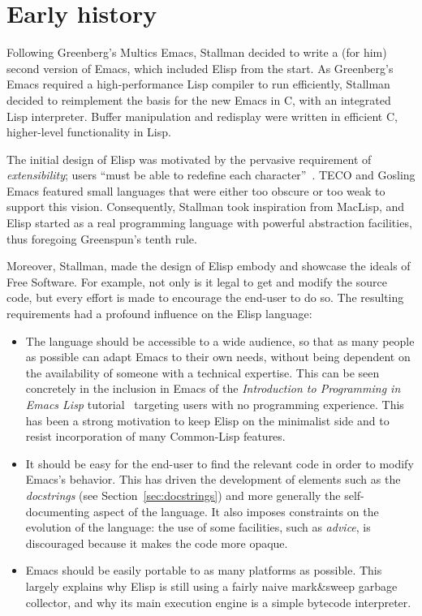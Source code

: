 \documentclass[format=acmsmall, review=false, screen=true]{acmart}
\newcommand \Elisp {Elisp}
\begin{document}
\section{Early history}         %
\label{sec:early-history}

Following Greenberg's Multics Emacs, Stallman decided to write a (for
him) second version of Emacs, which included \Elisp{} from the start.
As Greenberg's Emacs required a high-performance Lisp compiler to run
efficiently, Stallman decided to reimplement the basis for the new
Emacs in C, with an integrated Lisp interpreter.  Buffer manipulation
and redisplay were written in efficient C, higher-level functionality
in Lisp.

The initial design of \Elisp{} was motivated by the pervasive
requirement of \emph{extensibility}; users ``must be able to
redefine each character''~\cite{Stallman1981}.  TECO and Gosling Emacs
featured small languages that were either too obscure or too weak to
support this vision.  Consequently, Stallman took inspiration from
MacLisp, and \Elisp{} started as a real programming language with
powerful abstraction facilities, thus foregoing Greenspun's tenth
rule.

Moreover, Stallman, made the design of \Elisp{}
embody and showcase the ideals of Free Software.  For example, not only
is it legal to get and modify the source code, but every effort
is made to encourage the end-user to do so.  The resulting requirements had a profound
influence on the \Elisp{} language:
\begin{itemize}
\item The language should be accessible to a wide audience, so that as many
  people as possible can adapt Emacs to their own needs, without being
  dependent on the availability of someone with a technical expertise.
  This can be seen concretely in the inclusion in Emacs of the
  \emph{Introduction to Programming in Emacs Lisp}
  tutorial~\citep{ElispIntro} targeting users with no programming
  experience.  This has been a strong motivation to keep \Elisp{} on the
  minimalist side and to resist incorporation of many Common-Lisp features.
\item It should be easy for the end-user to find the relevant code in order
  to modify Emacs's behavior.  This has driven the development of elements
  such as the \emph{docstrings} (see Section~\ref{sec:docstrings}) and more generally the self-documenting
  aspect of the language.  It also imposes constraints on the evolution of
  the language: the use of some facilities, such as \emph{advice}, is
  discouraged because it makes the code more opaque.
\item Emacs should be easily portable to as many platforms as possible.
  This largely explains why \Elisp{} is still using a fairly naive
  mark\&sweep garbage collector, and why its main execution engine is
  a simple bytecode interpreter.
\end{itemize}
\end{document}

